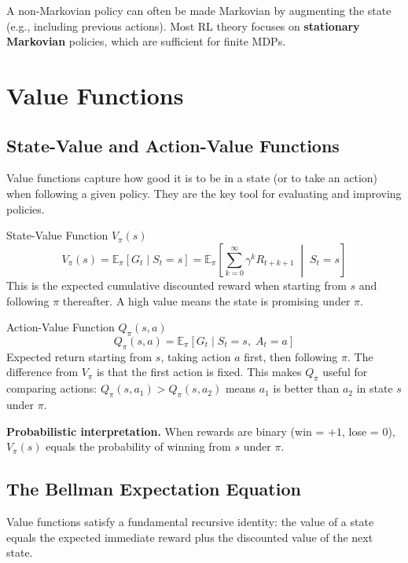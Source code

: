 \documentclass[11pt,a4paper]{article}
\newcommand{\E}{\mathbb{E}}
\begin{document}
A non-Markovian policy can often be made Markovian by augmenting the state (e.g., including previous actions). Most RL theory focuses on \textbf{stationary Markovian} policies, which are sufficient for finite MDPs.

\section{Value Functions}

\subsection{State-Value and Action-Value Functions}

Value functions capture how good it is to be in a state (or to take an action) when following a given policy. They are the key tool for evaluating and improving policies.

\begin{defbox}{State-Value Function $V_\pi(s)$}
\[
V_\pi(s) = \E_\pi\!\left[G_t \mid S_t = s\right] = \E_\pi\!\left[\sum_{k=0}^{\infty} \gamma^k R_{t+k+1} \;\middle|\; S_t = s\right]
\]
This is the expected cumulative discounted reward when starting from $s$ and following $\pi$ thereafter. A high value means the state is promising under $\pi$.
\end{defbox}

\begin{defbox}{Action-Value Function $Q_\pi(s, a)$}
\[
Q_\pi(s, a) = \E_\pi\!\left[G_t \mid S_t = s,\; A_t = a\right]
\]
Expected return starting from $s$, taking action $a$ first, then following $\pi$. The difference from $V_\pi$ is that the first action is fixed. This makes $Q_\pi$ useful for comparing actions: $Q_\pi(s,a_1) > Q_\pi(s,a_2)$ means $a_1$ is better than $a_2$ in state $s$ under $\pi$.
\end{defbox}

\textbf{Probabilistic interpretation.} When rewards are binary (win = $+1$, lose = $0$), $V_\pi(s)$ equals the probability of winning from $s$ under $\pi$.

\subsection{The Bellman Expectation Equation}

Value functions satisfy a fundamental recursive identity: the value of a state equals the expected immediate reward plus the discounted value of the next state.
\end{document}
